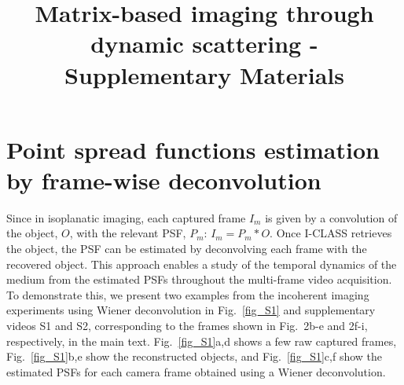 \documentclass[pdflatex,sn-mathphys-num,Numbered]{sn-jnl}%
\theoremstyle{thmstyleone}%
\theoremstyle{thmstyletwo}%
\theoremstyle{thmstylethree}%
\begin{document}
\title[Article Title]{Matrix-based imaging through dynamic scattering - Supplementary Materials}

\author[1]{ }

\author[1]{ }

\author[1]{ }

\author*[1]{ }



\maketitle








\newpage


\section{Point spread functions estimation by frame-wise deconvolution}

Since in isoplanatic imaging, each captured frame $I_m$ is given by a convolution of the object, $O$, with the relevant PSF, $P_m$: $I_m = P_m * O$. Once I-CLASS retrieves the object, the PSF can be estimated by deconvolving each frame with the recovered object. 
This approach enables a study of the temporal dynamics of the medium from the estimated PSFs throughout the multi-frame video acquisition. To demonstrate this, we present two examples from the incoherent imaging experiments using Wiener deconvolution in Fig.~\ref{fig_S1} and supplementary videos S1 and S2, corresponding to the frames shown in Fig.~2b-e and 2f-i, respectively, in the main text. Fig.~\ref{fig_S1}a,d shows a few raw captured frames, Fig.~\ref{fig_S1}b,e show the reconstructed objects, and Fig.~\ref{fig_S1}c,f show the estimated PSFs for each camera frame obtained using a Wiener deconvolution.
\end{document}
